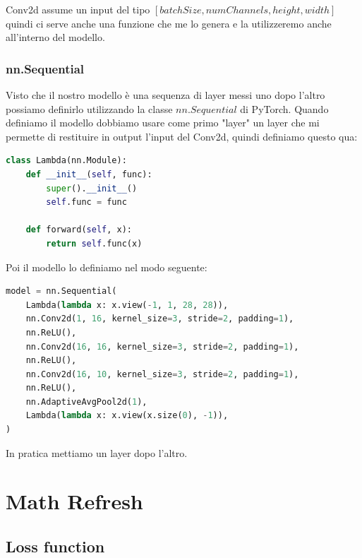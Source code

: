 \documentclass[14pt]{extreport}
\begin{document}
Conv2d assume un input del tipo $[batchSize, numChannels, height, width]$ quindi ci serve anche una funzione che me lo genera e la utilizzeremo anche all'interno del modello.

\subsection{nn.Sequential}

Visto che il nostro modello è una sequenza di layer messi uno dopo l'altro possiamo definirlo utilizzando
la classe $nn.Sequential$ di PyTorch.
Quando definiamo il modello dobbiamo usare come primo "layer" un layer che mi permette di restituire in output l'input del Conv2d, quindi definiamo questo qua:

\begin{lstlisting}[language=Python]
class Lambda(nn.Module):
    def __init__(self, func):
        super().__init__()
        self.func = func

    def forward(self, x):
        return self.func(x)
\end{lstlisting}

Poi il modello lo definiamo nel modo seguente:

\begin{lstlisting}[language=Python]
model = nn.Sequential(
	Lambda(lambda x: x.view(-1, 1, 28, 28)),
	nn.Conv2d(1, 16, kernel_size=3, stride=2, padding=1),
	nn.ReLU(),
	nn.Conv2d(16, 16, kernel_size=3, stride=2, padding=1),
	nn.ReLU(),
	nn.Conv2d(16, 10, kernel_size=3, stride=2, padding=1),
	nn.ReLU(),
	nn.AdaptiveAvgPool2d(1),
	Lambda(lambda x: x.view(x.size(0), -1)),
)
\end{lstlisting}

In pratica mettiamo un layer dopo l'altro.



















\chapter{Math Refresh}

\section{Loss function}
\end{document}
